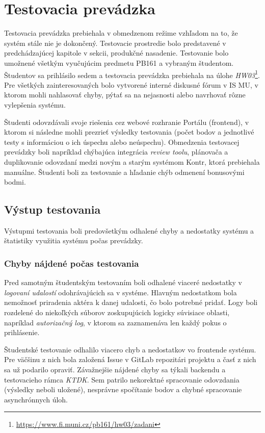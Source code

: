 \documentclass[
  digital, %
  twoside, %
  table,   %
  lof,     %
  lot,     %
]{fithesis3}
\begin{document}
\chapter{Testovacia prevádzka}

Testovacia prevádzka prebiehala v obmedzenom režime vzhľadom na to, že systém stále nie je dokončený. Testovacie prostredie bolo predstavené v predchádzajúcej kapitole v sekcii, produkčné nasadenie. Testovanie bolo umožnené všetkým vyučujúcim predmetu PB161 a vybraným študentom. Študentov sa prihlásilo sedem a testovacia prevádzka prebiehala na úlohe \emph{HW03}\footnote{\url{https://www.fi.muni.cz/pb161/hw03/zadani}}. Pre všetkých zainteresovaných bolo vytvorené interné diskusné fórum v IS MU, v ktorom mohli nahlasovať chyby, pýtať sa na nejasnosti alebo navrhovať rôzne vylepšenia systému.

Študenti odovzdávali svoje riešenia cez webové rozhranie Portálu (frontend), v ktorom si následne mohli prezrieť výsledky testovania (počet bodov a jednotlivé testy s informáciou o ich úspechu alebo neúspechu). Obmedzenia testovacej prevádzky boli napríklad chýbajúca integrácia \emph{review toolu}, plánovača a duplikovanie odovzdaní medzi novým a starým systémom Kontr, ktorá prebiehala manuálne. Študenti boli za testovanie a hľadanie chýb odmenení bonusovými bodmi.

\section{Výstup testovania}
Výstupmi testovania boli predovšetkým odhalené chyby a nedostatky systému a štatistiky využitia systému počas prevádzky.

\subsection{Chyby nájdené počas testovania}

Pred samotným študentským testovaním boli odhalené viaceré nedostatky v \emph{logovaní udalostí} odohrávajúcich sa v systéme. Hlavným nedostatkom bola nemožnosť priradenia aktéra k danej udalosti, čo bolo potrebné pridať. Logy boli rozdelené do niekoľkých súborov zoskupujúcich logicky súvisiace oblasti, napríklad \emph{autorizačný log}, v ktorom sa zaznamenáva len každý pokus o prihlásenie.

Študentské testovanie odhalilo viacero chyb a nedostatkov vo frontende systému. Pre väčšinu z nich bola založená Issue v GitLab repozitári projektu a časť z nich sa už podarilo opraviť. Závažnejšie nájdené chyby sa týkali backendu a testovacieho rámca \emph{KTDK}. Sem patrilo nekorektné spracovanie odovzdania (výsledky neboli uložené), nesprávne spočítanie bodov a chybné spracovanie asynchrónnych úloh.
\end{document}
